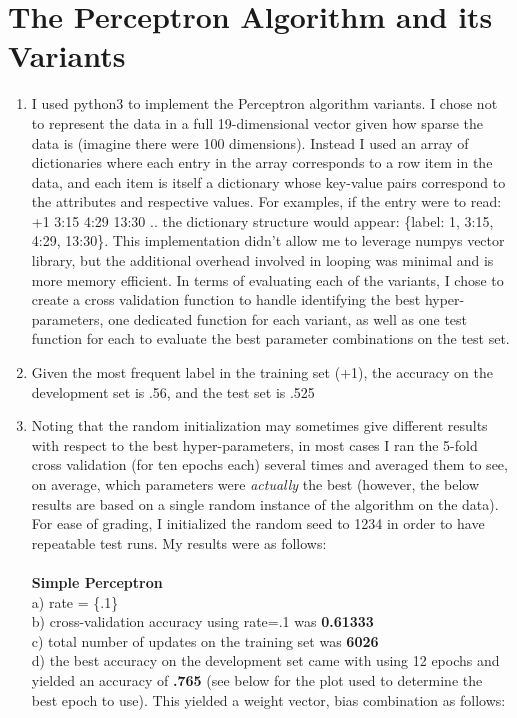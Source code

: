 \documentclass[11pt,a4paper]{article}
\begin{document}
	\section{The Perceptron Algorithm and its Variants}
		\begin{enumerate}
			\item I used python3 to implement the Perceptron algorithm variants. I chose not to represent the data in a full 19-dimensional vector given how sparse the data is (imagine there were 100 dimensions). Instead I used an array of dictionaries where each entry in the array corresponds to a row item in the data, and each item is itself a dictionary whose key-value pairs correspond to the attributes and respective values. For examples, if the entry were to read: +1 3:15 4:29 13:30 .. the dictionary structure would appear: \{label: 1, 3:15, 4:29, 13:30\}. This implementation didn't allow me to leverage numpys vector library, but the additional overhead involved in looping was minimal and is more memory efficient. In terms of evaluating each of the variants, I chose to create a cross validation function to handle identifying the best hyper-parameters, one dedicated function for each variant, as well as one test function for each to evaluate the best parameter combinations on the test set.
			\item Given the most frequent label in the training set (+1), the accuracy on the development set is .56, and the test set is .525
			\item Noting that the random initialization may sometimes give different results with respect to the best hyper-parameters, in most cases I ran the 5-fold cross validation (for ten epochs each) several times and averaged them to see, on average, which parameters were \textit{actually} the best (however, the below results are based on a single random instance of the algorithm on the data). For ease of grading, I initialized the random seed to 1234 in order to have repeatable test runs. My results were as follows:\\ \\
			\textbf{Simple Perceptron}    \\
			a) rate = \{.1\}  \\
			b) cross-validation accuracy using rate=.1 was \textbf{0.61333}\\
			c) total number of updates on the training set was \textbf{6026}\\
			d) the best accuracy on the development set came with using 12 epochs and yielded an accuracy of \textbf{.765} (see below for the plot used to determine the best epoch to use). This yielded a weight vector, bias combination as follows:\\

\end{enumerate}
\end{document}
